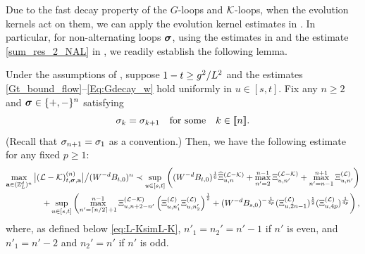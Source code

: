 Due to the fast decay property of the $G$-loops and $\mathcal K$-loops, when the evolution kernels act on them, we can apply the evolution kernel estimates in . In particular, for non-alternating loops ${\boldsymbol{\sigma}}$, using the estimates in  and the estimate \eqref{sum_res_2_NAL} in , we readily establish the following lemma.  


\begin{lemma}\label{lem:STOeq_NQ}  
Under the assumptions of , suppose $1-t\ge g^2/L^{2}$ and the estimates \eqref{Gt_bound_flow}--\eqref{Eq:Gdecay_w} hold uniformly in $u\in[s,t]$. Fix any $n\ge 2$ and ${\boldsymbol{\sigma}}\in \{+,-\}^n$ satisfying 
\begin{equation}\label{NALsigm}
\sigma_k=\sigma_{k+1} \quad \text{for some}\quad  k\in\llbracket{n}\rrbracket.
\end{equation} 
(Recall that $\sigma_{n+1}=\sigma_1$ as a convention.) 
Then, we have the following estimate for any fixed $p\ge 1$: 
\begin{align}\label{am;asoiuw}
\max_{{\mathbf{a}}\in ({\mathbb Z}_L^d)^n} \big|({\mathcal L}-{\mathcal K})^{(n)}_{t, {\boldsymbol{\sigma}}, {\mathbf{a}}} \big|  \big/ (W^{-d}B_{t,0})^n\prec \sup_{u\in [s,t]}
  \left( (W^{-d}B_{t,0})^{\frac 1 6}\widehat\Xi^{(\mathcal L-\mathcal K)}_{u, n}+ \max_{n'=2}^{n-1} \Xi^{({\mathcal L-\mathcal K})}_{u,n'}+ \max_{n'=n-1}^{n+1} \Xi^{({\mathcal L})}_{u,n'} \right)\\
+\sup_{u\in [s,t]}
  \left(\max_{n'=\lceil n/2\rceil + 1}^{n-1} \Xi^{({\mathcal L-\mathcal K})}_{u,n+2-n'} \left({\Xi^{({\mathcal L})}_{u,n_1'} \Xi^{({\mathcal L})}_{u,n_2'}}\right)^{\frac 12 } +(W^{-d}B_{s,0})^{-\frac{1}{4p}}(\Xi^{(\mathcal L)}_{u, {2n-1}})^{\frac 1 2}(\Xi^{(\mathcal L)}_{u, 4p})^{\frac{1}{4p}}\right),\nonumber
\end{align} 
where, as defined below \eqref{eq:L-KsimL-K}, $n'_1=n_2'=n'-1$ if $n'$ is even, and $n'_1=n'-2$ and $n_2'=n'$ if $n'$ is odd. %
\end{lemma}

